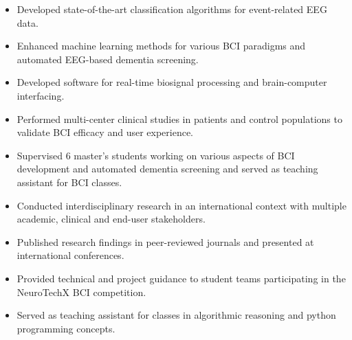 \documentclass{resume}
\begin{document}
\begin{itemize}
 \item Developed state-of-the-art classification algorithms for event-related
 EEG data.
 \item Enhanced machine learning methods for various BCI
 paradigms and automated EEG-based dementia screening.
 \item Developed software for real-time biosignal processing and
 brain-computer interfacing.
 \item Performed multi-center clinical studies in patients and control
 populations to validate BCI efficacy and user experience.
 \item Supervised 6 master's students working on various aspects of BCI development
 and automated dementia screening and served as teaching assistant for BCI classes.
 \item Conducted interdisciplinary research in an international context with
 multiple academic, clinical and end-user stakeholders.
 \item Published research findings in peer-reviewed journals and presented at international conferences.

\end{itemize}
\bigskip

\begin{itemize}
  \item Provided technical and project guidance to student teams participating in the NeuroTechX BCI competition.
\end{itemize}
\bigskip

\begin{itemize}
  \item Served as teaching assistant for classes in algorithmic reasoning and
    python programming concepts.
\end{itemize}
\bigskip

\end{document}
